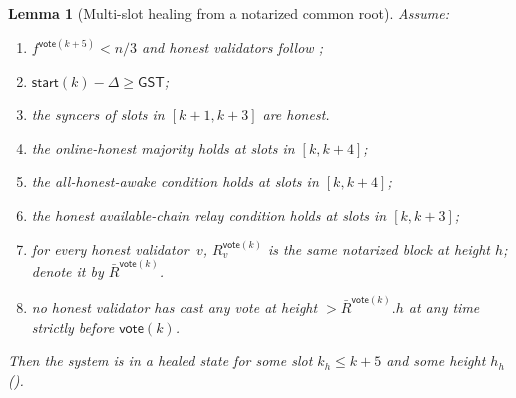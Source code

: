 \ifx\litemode\undefined\documentclass{article}\fi
\newcommand{\start}{\mathsf{start}}
\newcommand{\vote}{\mathsf{vote}}
\newcommand{\comm}[1]{\bar{#1}}
\newcommand{\getConfirmed}{\textsf{getConfirmed}\xspace}
\theoremstyle{plain}
\newtheorem{lemma}{Lemma}
\theoremstyle{definition}
\theoremstyle{remark}
\newcommand{\GST}{\ensuremath{\mathsf{GST}}}
\newcommand{\OHM}{online-honest majority\xspace}
\newcommand{\HAR}{honest available-chain relay\xspace}
\newcommand{\AHA}{all-honest-awake\xspace}
\begin{document}
\begin{lemma}[Multi-slot healing from a notarized common root]\label{rev:lem:healing-from-notarized-multi}
Assume:
\begin{enumerate}
  \item\label{rev:hfnm:f} $f^{\vote(k+5)} < n/3$ and honest validators follow ;
  \item\label{rev:hfnm:sync} $\start(k) - \Delta \geq \GST$;
  \item\label{rev:hfnm:syncers} the syncers of slots in $[k+1, k+3]$ are honest.
  \item\label{rev:hfnm:ohm} the \OHM holds at slots in $[k, k+4]$;
  \item\label{rev:hfnm:aha} the \AHA condition holds at slots in $[k, k+4]$;
  \item\label{rev:hfnm:har} the \HAR condition holds at slots in $[k, k+3]$;
  \item\label{rev:hfnm:r} for every honest validator~$v$, $R_v^{\vote(k)}$ is the same notarized block at height $h$; denote it by $\comm{R}^{\vote(k)}$.
  \item\label{rev:hfnm:nh} no honest validator has cast any vote at height $> \comm{R}^{\vote(k)}.h$ at any time strictly before $\vote(k)$.
\end{enumerate}
Then the system is in a healed state for some slot $k_h \leq k+5$ and some height $h_h$ ().
\end{lemma}
\end{document}
